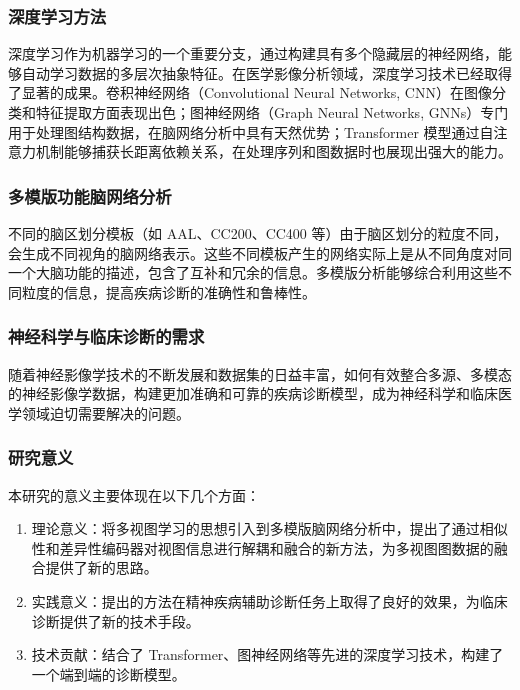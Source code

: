 \documentclass[12pt,a4paper]{article}
\begin{document}
\subsubsection{深度学习方法}

深度学习作为机器学习的一个重要分支，通过构建具有多个隐藏层的神经网络，能够自动学习数据的多层次抽象特征\cite{lecun2015deep}。在医学影像分析领域，深度学习技术已经取得了显著的成果。卷积神经网络（Convolutional Neural Networks, CNN）在图像分类和特征提取方面表现出色；图神经网络（Graph Neural Networks, GNNs）专门用于处理图结构数据，在脑网络分析中具有天然优势；Transformer 模型通过自注意力机制能够捕获长距离依赖关系，在处理序列和图数据时也展现出强大的能力\cite{vaswani2017attention}。

\subsubsection{多模版功能脑网络分析}

不同的脑区划分模板（如 AAL、CC200、CC400 等）由于脑区划分的粒度不同，会生成不同视角的脑网络表示。这些不同模板产生的网络实际上是从不同角度对同一个大脑功能的描述，包含了互补和冗余的信息。多模版分析能够综合利用这些不同粒度的信息，提高疾病诊断的准确性和鲁棒性。

\subsubsection{神经科学与临床诊断的需求}

随着神经影像学技术的不断发展和数据集的日益丰富，如何有效整合多源、多模态的神经影像学数据，构建更加准确和可靠的疾病诊断模型，成为神经科学和临床医学领域迫切需要解决的问题。

\subsubsection{研究意义}

本研究的意义主要体现在以下几个方面：

\begin{enumerate}
\item 理论意义：将多视图学习的思想引入到多模版脑网络分析中，提出了通过相似性和差异性编码器对视图信息进行解耦和融合的新方法，为多视图图数据的融合提供了新的思路。
\item 实践意义：提出的方法在精神疾病辅助诊断任务上取得了良好的效果，为临床诊断提供了新的技术手段。
\item 技术贡献：结合了 Transformer、图神经网络等先进的深度学习技术，构建了一个端到端的诊断模型。
\end{enumerate}
\end{document}
